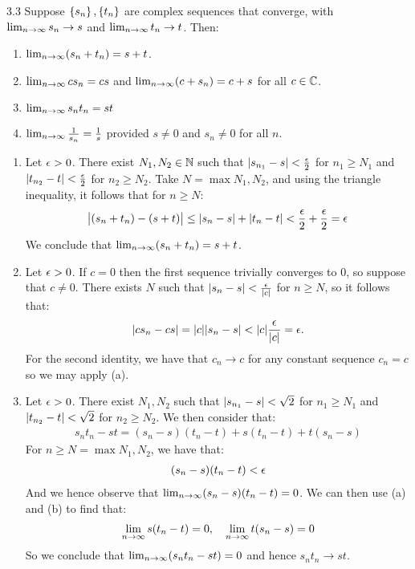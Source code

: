 \begin{theorem}{}{3.3}
    Suppose $\set{s_n}, \set{t_n}$ are complex sequences that converge, with $\lim_{n \rightarrow \infty} s_n \rightarrow s$ and $\lim_{n \rightarrow \infty} t_n \rightarrow t$. Then:
    \begin{enumerate}
        \item $\lim_{n \rightarrow \infty}(s_n + t_n) = s + t$.
        \item $\lim_{n \rightarrow \infty} cs_n = cs$ and $\lim_{n \rightarrow \infty} (c + s_n) = c + s$ for all $c \in \mathbb{C}$.
        \item $\lim_{n \rightarrow \infty} s_nt_n = st$
        \item $\lim_{n \rightarrow \infty} \frac{1}{s_n} = \frac{1}{s}$ provided $s \neq 0$ and $s_n \neq 0$ for all $n$.
    \end{enumerate}
\end{theorem}
\begin{nproof}
    \begin{enumerate}
        \item Let $\epsilon > 0$. There exist $N_1, N_2 \in \mathbb{N}$ such that $\abs{s_{n_1} - s} < \frac{\epsilon}{2}$ for $n_1 \geq N_1$ and $\abs{t_{n_2} - t} < \frac{\epsilon}{2}$ for $n_2 \geq N_2$. Take $N = \max{N_1, N_2}$, and using the triangle inequality, it follows that for $n \geq N$:
        \begin{align*}
            \abs{(s_n + t_n) - (s + t)} \leq \abs{s_n - s} + \abs{t_n - t} < \frac{\epsilon}{2} + \frac{\epsilon}{2} = \epsilon
        \end{align*} 
        We conclude that $\lim_{n \rightarrow \infty} (s_n + t_n) = s + t$. 
        \item Let $\epsilon > 0$. If $c = 0$ then the first sequence trivially converges to $0$, so suppose that $c \neq 0$. There exists $N$ such that $\abs{s_n - s} < \frac{\epsilon}{\abs{c}}$ for $n \geq N$, so it follows that:
        \begin{align*}
            \abs{cs_n - cs} = \abs{c}\abs{s_n - s} < \abs{c}\frac{\epsilon}{\abs{c}} = \epsilon.
        \end{align*} For the second identity, we have that $c_n \rightarrow c$ for any constant sequence $c_n = c$ so we may apply (a).
        \item Let $\epsilon > 0$. There exist $N_1, N_2$ such that $\abs{s_{n_1} - s} < \sqrt{2}$ for $n_1 \geq N_1$ and $\abs{t_{n_2} - t} < \sqrt{2}$ for $n_2 \geq N_2$. We then consider that:
        \begin{align*}
        s_nt_n - st = (s_n - s)(t_n - t) + s(t_n - t) + t(s_n - s)
        \end{align*}
        For $n \geq N = \max{N_1, N_2}$, we have that:
        \begin{align*}
            (s_n - s)(t_n - t) < \epsilon
        \end{align*}
        And we hence observe that $\lim_{n \rightarrow \infty} (s_n - s)(t_n - t) = 0$. We can then use (a) and (b) to find that:
        \begin{align*}
            \lim_{n \rightarrow \infty} s(t_n - t) = 0, \quad \lim_{n \rightarrow \infty} t(s_n - s) = 0
        \end{align*}
        So we conclude that $\lim_{n \rightarrow \infty} (s_nt_n - st) = 0$ and hence $s_nt_n \rightarrow st$.
    \end{enumerate}
\end{nproof}

